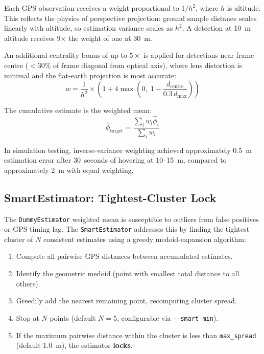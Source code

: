 Each GPS observation receives a weight proportional to $1/h^2$, where $h$ is
altitude. This reflects the physics of perspective projection: ground sample
distance scales linearly with altitude, so estimation variance scales as $h^2$.
A detection at 10~m altitude receives 9$\times$ the weight of one at 30~m.

An additional centrality bonus of up to $5\times$ is applied for detections near
frame centre ($< 30$\% of frame diagonal from optical axis), where lens distortion
is minimal and the flat-earth projection is most accurate:
\begin{equation}
    w = \frac{1}{h^2} \times \left(1 + 4 \max\!\left(0,\;
    1 - \frac{d_\text{centre}}{0.3 \, d_\text{max}}\right)\right)
\end{equation}

The cumulative estimate is the weighted mean:
\begin{equation}
    \hat{\phi}_\text{target} = \frac{\sum_i w_i \hat{\phi}_i}{\sum_i w_i}
\end{equation}

In simulation testing, inverse-variance weighting achieved approximately 0.5~m
estimation error after 30~seconds of hovering at 10--15~m, compared to approximately
2~m with equal weighting.

\subsection{SmartEstimator: Tightest-Cluster Lock}

The \texttt{DummyEstimator} weighted mean is susceptible to outliers from false
positives or GPS timing lag. The \texttt{SmartEstimator} addresses this by finding
the tightest cluster of $N$ consistent estimates using a greedy medoid-expansion
algorithm:

\begin{enumerate}
    \item Compute all pairwise GPS distances between accumulated estimates.
    \item Identify the geometric medoid (point with smallest total distance to all others).
    \item Greedily add the nearest remaining point, recomputing cluster spread.
    \item Stop at $N$ points (default $N = 5$, configurable via \texttt{-{}-smart-min}).
    \item If the maximum pairwise distance within the cluster is less than
          \texttt{max\_spread} (default 1.0~m), the estimator \textbf{locks}.
\end{enumerate}

